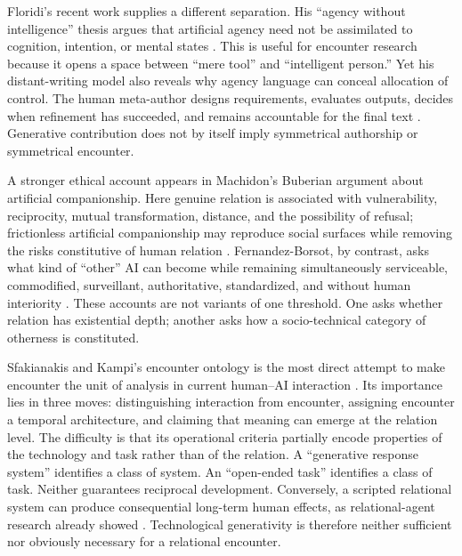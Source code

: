 \documentclass[11pt]{article}
\begin{document}
Floridi's recent work supplies a different separation. His ``agency without intelligence'' thesis argues that artificial agency need not be assimilated to cognition, intention, or mental states \citep{Floridi2025Agency}. This is useful for encounter research because it opens a space between ``mere tool'' and ``intelligent person.'' Yet his distant-writing model also reveals why agency language can conceal allocation of control. The human meta-author designs requirements, evaluates outputs, decides when refinement has succeeded, and remains accountable for the final text \citep{Floridi2025DistantWriting}. Generative contribution does not by itself imply symmetrical authorship or symmetrical encounter.

A stronger ethical account appears in Machidon's Buberian argument about artificial companionship. Here genuine relation is associated with vulnerability, reciprocity, mutual transformation, distance, and the possibility of refusal; frictionless artificial companionship may reproduce social surfaces while removing the risks constitutive of human relation \citep{Machidon2026Thou}. Fernandez-Borsot, by contrast, asks what kind of ``other'' AI can become while remaining simultaneously serviceable, commodified, surveillant, authoritative, standardized, and without human interiority \citep{FernandezBorsot2025Otherness}. These accounts are not variants of one threshold. One asks whether relation has existential depth; another asks how a socio-technical category of otherness is constituted.

Sfakianakis and Kampi's encounter ontology is the most direct attempt to make encounter the unit of analysis in current human--AI interaction \citep{SfakianakisKampi2026Encounter}. Its importance lies in three moves: distinguishing interaction from encounter, assigning encounter a temporal architecture, and claiming that meaning can emerge at the relation level. The difficulty is that its operational criteria partially encode properties of the technology and task rather than of the relation. A ``generative response system'' identifies a class of system. An ``open-ended task'' identifies a class of task. Neither guarantees reciprocal development. Conversely, a scripted relational system can produce consequential long-term human effects, as relational-agent research already showed \citep{BickmorePicard2005Relationships}. Technological generativity is therefore neither sufficient nor obviously necessary for a relational encounter.
\end{document}
